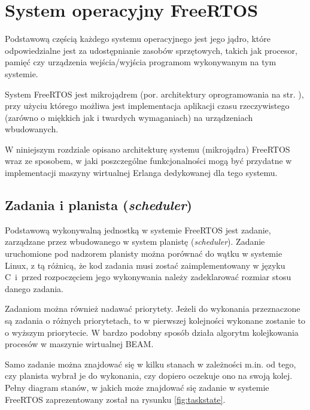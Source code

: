 \chapter{System operacyjny FreeRTOS}
\label{cha:freertos}

Podstawową częścią każdego systemu operacyjnego jest jego jądro, które odpowiedzialne jest za udostępnianie zasobów sprzętowych, takich jak procesor, pamięć  czy urządzenia wejścia/wyjścia programom wykonywanym na tym systemie.

System FreeRTOS jest mikrojądrem (por. architektury oprogramowania na str. \pageref{ref:architektury}), przy użyciu którego możliwa jest implementacja aplikacji czasu rzeczywistego (zarówno o miękkich jak i twardych wymaganiach) na urządzeniach wbudowanych.

W niniejszym rozdziale opisano architekturę systemu (mikrojądra) FreeRTOS wraz ze sposobem, w jaki
poszczególne funkcjonalności mogą być przydatne w implementacji maszyny wirtualnej Erlanga dedykowanej dla tego systemu.

\section{Zadania i planista (\emph{scheduler})}
\label{sec:rtosScheduler}

Podstawową wykonywalną jednostką w systemie FreeRTOS jest zadanie, zarządzane przez wbudowanego w system planistę (\emph{scheduler}).
Zadanie uruchomione pod nadzorem planisty można porównać do wątku w systemie Linux, z tą różnicą, że kod zadania musi zostać zaimplementowany w języku C~i~przed rozpoczęciem jego wykonywania należy zadeklarować rozmiar stosu danego zadania.

Zadaniom można również nadawać priorytety. Jeżeli do wykonania przeznaczone są zadania o różnych priorytetach, to w pierwszej kolejności wykonane zostanie to o wyższym priorytecie. W bardzo podobny sposób działa algorytm kolejkowania procesów w maszynie wirtualnej BEAM.

Samo zadanie można znajdować się w kilku stanach w zależności m.in. od tego, czy planista wybrał je do wykonania, czy dopiero oczekuje ono na swoją kolej. Pełny diagram stanów, w jakich może znajdować się zadanie w systemie FreeRTOS zaprezentowany został na rysunku \ref{fig:taskstate}.

